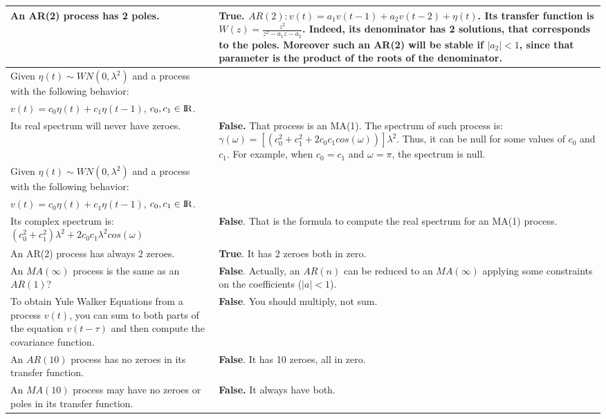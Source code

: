 \documentclass[10pt,a4paper]{article}
\begin{document}
\begin{center}
\pagebreak
\begin{tabular}{ | m{200pt} | m{200pt}| }
\hline
 An AR(2) process has 2 poles.
      & \textbf{True}. \linebreak $AR(2): v(t)=a_1v(t-1)+a_2v(t-2)+\eta(t)$. Its transfer function is $W(z)=\frac{z^2}{z^2-a_1z-a_2}$. Indeed, its denominator has 2 solutions, that corresponds to the poles. 
	Moreover such an AR(2) will be stable if $|a_2|<1$, since that parameter is the product of the roots of the denominator.
      \\ \hline
	 Given $\eta(t) \sim WN(0,\lambda^2)$ and a process with the following behavior: \\ $v(t)=c_0\eta(t)+c_1\eta(t-1)$, $c_0,c_1 \in {\rm I\!R}$. \\
      Its real spectrum will never have zeroes.
      & \textbf{False.} That process is an MA(1). \linebreak The spectrum of such process is: $\gamma(\omega)=[(c_0^2+c_1^2+2c_0c_1cos(\omega))]\lambda^2$. Thus, it can be null for some values of $c_0$ and $c_1$. For example, when $c_0=c_1$ and $\omega=\pi$, the spectrum is null. 
      \\ \hline 
      Given $\eta(t) \sim WN(0,\lambda^2)$ and a process with the following behavior: \\ $v(t)=c_0\eta(t)+c_1\eta(t-1)$, $c_0,c_1 \in {\rm I\!R}$. \\
      Its complex spectrum is:
      $(c_0^2+c_1^2)\lambda^2 + 2c_0c_1\lambda^2cos(\omega)$
      & \textbf{False}. That is the formula to compute the real spectrum for an MA(1) process.
     \\ \hline 
     An AR(2) process has always 2 zeroes. & \textbf{True}. It has 2 zeroes both in zero.
     \\ \hline
     An $MA(\infty)$ process is the same as an $AR(1)$? & \textbf{False}. Actually, an $AR(n)$ can be reduced to an $MA(\infty)$ applying some constraints on the coefficients ($|a|<1$). 
     \\ \hline
     To obtain Yule Walker Equations from a process $v(t)$, you can sum to both parts of the equation $v(t-\tau)$ and then compute the covariance function. & \textbf{False}. You should multiply, not sum.
     \\ \hline
     An $AR(10)$ process has no zeroes in its transfer function. & \textbf{False}. It has 10 zeroes, all in zero.
     \\ \hline
     An $MA(10)$ process may have no zeroes or poles in its transfer function. & \textbf{False.} It always have both.

\end{tabular}
\end{center}
\end{document}
